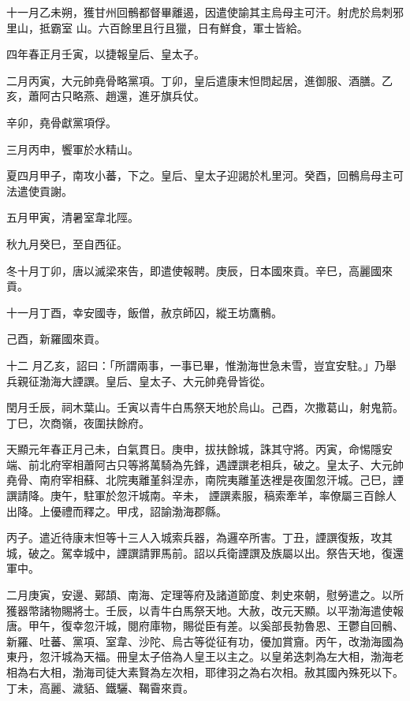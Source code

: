 \begin{pinyinscope}
 十一月乙未朔，獲甘州回鶻都督畢離遏，因遣使諭其主烏母主可汗。射虎於烏刺邪里山，抵霸室
 山。六百餘里且行且獵，日有鮮食，軍士皆給。



 四年春正月壬寅，以捷報皇后、皇太子。



 二月丙寅，大元帥堯骨略黨項。丁卯，皇后遣康末怛問起居，進御服、酒膳。乙亥，蕭阿古只略燕、趙還，進牙旗兵仗。



 辛卯，堯骨獻黨項俘。



 三月丙申，饗軍於水精山。



 夏四月甲子，南攻小蕃，下之。皇后、皇太子迎謁於札里河。癸酉，回鶻烏母主可法遣使貢謝。



 五月甲寅，清暑室韋北陘。



 秋九月癸巳，至自西征。



 冬十月丁卯，唐以滅梁來告，即遣使報聘。庚辰，日本國來貢。辛巳，高麗國來貢。



 十一月丁酉，幸安國寺，飯僧，赦京師囚，縱王坊鷹鶻。



 己酉，新羅國來貢。



 十二
 月乙亥，詔曰：「所謂兩事，一事已畢，惟渤海世急未雪，豈宜安駐。」乃舉兵親征渤海大諲譔。皇后、皇太子、大元帥堯骨皆從。



 閏月壬辰，祠木葉山。壬寅以青牛白馬祭天地於烏山。己酉，次撒葛山，射鬼箭。丁巳，次商嶺，夜圍扶餘府。



 天顯元年春正月己未，白氣貫日。庚申，拔扶餘城，誅其守將。丙寅，命惕隱安端、前北府宰相蕭阿古只等將萬騎為先鋒，遇諲譔老相兵，破之。皇太子、大元帥堯骨、南府宰相蘇、北院夷離堇斜涅赤，南院夷離堇迭裡是夜圍忽汗城。己巳，諲譔請降。庚午，駐軍於忽汗城南。辛未，
 諲譔素服，稿索牽羊，率僚屬三百餘人出降。上優禮而釋之。甲戌，詔諭渤海郡縣。



 丙子。遣近待康末怛等十三人入城索兵器，為邏卒所害。丁丑，諲譔復叛，攻其城，破之。駕幸城中，諲譔請罪馬前。詔以兵衛諲譔及族屬以出。祭告天地，復還軍中。



 二月庚寅，安邊、鄚頡、南海、定理等府及諸道節度、刺史來朝，慰勞遣之。以所獲器幣諸物賜將士。壬辰，以青牛白馬祭天地。大赦，改元天顯。以平渤海遣使報唐。甲午，復幸忽汗城，閱府庫物，賜從臣有差。以奚部長勃魯恩、王鬱自回鶻、新羅、吐蕃、黨項、室韋、沙陀、烏古等從征有功，優加賞齎。丙午，改渤海國為
 東丹，忽汗城為天福。冊皇太子倍為人皇王以主之。以皇弟迭刺為左大相，渤海老相為右大相，渤海司徒大素賢為左次相，耶律羽之為右次相。赦其國內殊死以下。丁未，高麗、濊貊、鐵驪、鞨霫來貢。




\end{pinyinscope}
